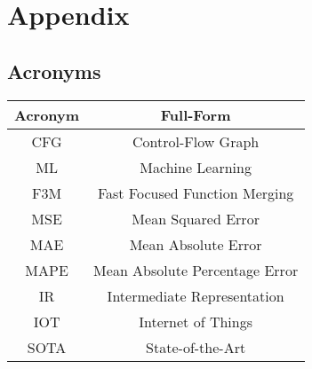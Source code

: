 \chapter{Appendix}
\section{Acronyms}

\begin{center}
\begin{tabular}{ |c|c| } 
 \hline
 \textbf{Acronym} & \textbf{Full-Form} \\ 
 \hline
 CFG & Control-Flow Graph \\ 
 ML & Machine Learning \\
 F3M & Fast Focused Function Merging\\
 MSE & Mean Squared Error\\
 MAE & Mean Absolute Error\\
 MAPE & Mean Absolute Percentage Error\\
 IR & Intermediate Representation\\
 IOT & Internet of Things\\
 SOTA & State-of-the-Art \\
 \hline
\end{tabular}
\end{center}